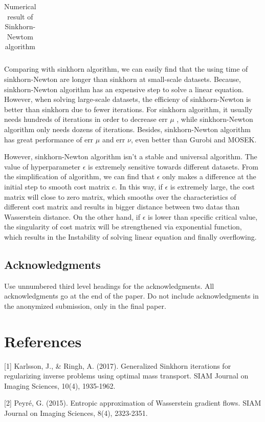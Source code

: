 \documentclass{article}
\begin{document}
\begin{large}
\begin{table}[H]
\begin{tabular}{|c|c|ccc|}
  \hline
  \end{tabular}
  \caption{\label{tab:table1}Numerical result of Sinkhorn-Newtom algorithm}
\end{table}
Comparing with sinkhorn algorithm, we can easily find that the using time of sinkhorn-Newton are longer than sinkhorn at small-scale datasets. Because, sinkhorn-Newton algorithm has an expensive step to solve a linear equation. However, when solving large-scale datasets, the efficieny of sinkhorn-Newton is better than sinkhorn due to fewer iterations. For sinkhorn algorithm, it usually needs hundreds of iterations in order to decrease err $\mu$ , while sinkhorn-Newton algorithm only needs dozens of iterations. Besides, sinkhorn-Newton algorithm has great performance of err $\mu$ and err $\nu$, even better than Gurobi and MOSEK. 

However, sinkhorn-Newton algorithm isn't a stable and universal algorithm. The value of hyperparameter $\epsilon$ is extremely sensitive towards different datasets. From the simplification of algorithm, we can find that $\epsilon$ only makes a difference at the initial step to smooth cost matrix $c$. In this way, if $\epsilon$ is extremely large, the cost matrix will close to zero matrix, which smooths over the characteristics of different cost matrix and results in bigger distance between two datas than Wasserstein distance. On the other hand, if $\epsilon$ is lower than specific critical value, the singularity of cost matrix will be strengthened via exponential function, which results in the Instability of solving linear equation and finally overflowing.
\subsection*{Acknowledgments}

Use unnumbered third level headings for the acknowledgments. All
acknowledgments go at the end of the paper. Do not include
acknowledgments in the anonymized submission, only in the final paper.
\end{large}
\section*{References}
\medskip
\small

[1] Karlsson, J., \& Ringh, A. (2017). Generalized Sinkhorn iterations for regularizing inverse problems using optimal mass transport. SIAM Journal on Imaging Sciences, 10(4), 1935-1962.

[2] Peyré, G. (2015). Entropic approximation of Wasserstein gradient flows. SIAM Journal on Imaging Sciences, 8(4), 2323-2351.
\end{document}
